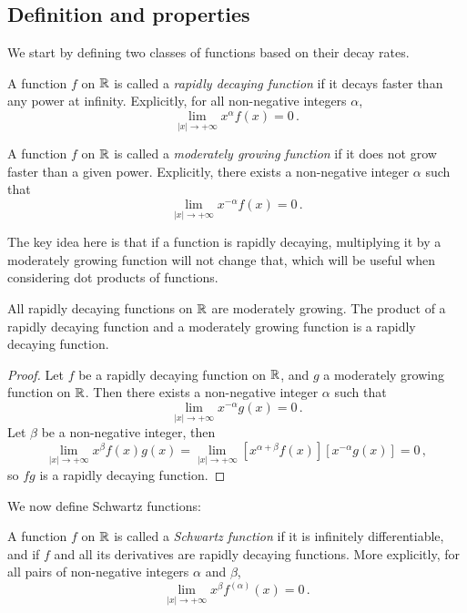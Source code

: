\subsection{Definition and properties}
We start by defining two classes of functions based on their decay rates.
\begin{definition}
	A function $f$ on $\mathbb{R}$ is called a \emph{rapidly decaying function} if it decays faster
	than any power at infinity. Explicitly, for all non-negative integers $\alpha$,
	\begin{equation}
		\lim_{|x|\to+\infty}x^\alpha f(x)=0\,.
	\end{equation}
\end{definition}
\begin{definition}
	A function $f$ on $\mathbb{R}$ is called a \emph{moderately growing function} if it does not
	grow faster than a given power. Explicitly, there exists a non-negative integer $\alpha$
	such that
	\begin{equation}
		\lim_{|x|\to+\infty}x^{-\alpha}f(x)=0\,.
	\end{equation}
\end{definition}
The key idea here is that if a function is rapidly decaying, multiplying it by a
moderately growing function will not change that, which will be useful when considering
dot products of functions.
\begin{proposition}
	\label{prop:rapid-times-moderate}
	All rapidly decaying functions on $\mathbb{R}$ are moderately growing. The product of a rapidly
	decaying function and a moderately growing function is a rapidly decaying function.
\end{proposition}
\begin{proof}
	Let $f$ be a rapidly decaying function on $\mathbb{R}$, and $g$ a moderately growing function on
	$\mathbb{R}$. Then there exists a non-negative integer $\alpha$ such that
	\begin{equation}
		\lim_{|x|\to+\infty}x^{-\alpha}g(x)=0\,.
	\end{equation}
	Let $\beta$ be a non-negative integer, then
	\begin{equation}
		\lim_{|x|\to+\infty}x^\beta f(x)g(x)=
		\lim_{|x|\to+\infty}[x^{\alpha+\beta} f(x)][x^{-\alpha}g(x)]=0\,,
	\end{equation}
	so $fg$ is a rapidly decaying function.
\end{proof}
We now define Schwartz functions:
\begin{definition}
	\label{def:schwartz-fn}
	A function $f$ on $\mathbb{R}$ is called a \emph{Schwartz function} if it is infinitely
	differentiable, and if $f$ and all its derivatives are rapidly decaying functions. More
	explicitly, for all pairs of non-negative integers $\alpha$ and $\beta$,
	\begin{equation}
		\lim_{|x|\to+\infty}x^\beta f^{(\alpha)}(x)=0\,.
	\end{equation}
\end{definition}
